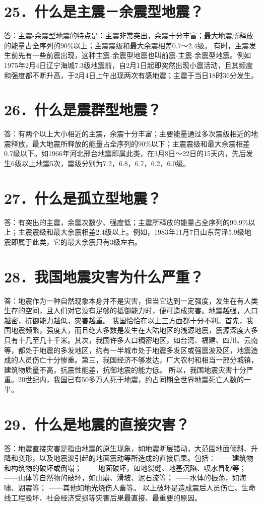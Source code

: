 \documentclass[a4paper,10pt,english]{sphinxmanual}
\begin{document}
\section{25．什么是主震－余震型地震？}
\label{\detokenize{index:id27}}
答：主震-余震型地震的特点是：主震非常突出，余震十分丰富；最大地震所释放的能量占全序列的90\%以上；主震震级和最大余震相差0.7～2.4级。
有时，主震发生前先有一些前震出现，这种主震-余震型地震也叫前震-主震-余震型地震。例如1975年2月4日辽宁海城7.3级地震前，自2月1日起即突然出现小震活动，且其频度和强度都不断升高，于2月4日上午出现两次有感地震；主震于当日18时36分发生。


\section{26．什么是震群型地震？}
\label{\detokenize{index:id28}}
答：有两个以上大小相近的主震，余震十分丰富；主要能量通过多次震级相近的地震释放，最大地震所释放的能量占全序列的90\%以下；主震震级和最大余震相差0.7级以下。如1966年河北邢台地震即属此类，在3月8日～22日的15天内，先后发生6级以上地震5次，震级分别为7.2，6.8，6.7，6.2，6.0级。


\section{27．什么是孤立型地震？}
\label{\detokenize{index:id29}}
答：有突出的主震，余震次数少、强度低；主震所释放的能量占全序列的99.9\%以上；主震震级和最大余震相差2.4级以上。例如，1983年11月7日山东菏泽5.9级地震即属于此类，它的最大余震只有3级左右。


\section{28．我国地震灾害为什么严重？}
\label{\detokenize{index:id30}}
答：地震作为一种自然现象本身并不是灾害，但当它达到一定强度，发生在有人类生存的空间，且人们对它没有足够的抵御能力时，便可造成灾害。地震越强，人口越密，抗御能力越低，灾害越重。
我国恰恰在以上三方面都十分不利。首先，我国地震频繁，强度大，而且绝大多数是发生在大陆地区的浅源地震，震源深度大多只有十几至几十千米。其次，我国许多人口稠密地区，如台湾、福建、四川、云南等，都处于地震的多发地区，约有一半城市处于地震多发区或强震波及区，地震造成的人员伤亡十分惨重。第三，我国经济不够发达，广大农村和相当一部分城镇，建筑物质量不高，抗震性能差，抗御地震的能力低。
所以，我国地震灾害十分严重。20世纪内，我国已有50多万人死于地震，约占同期全世界地震死亡人数的一半。


\section{29．什么是地震的直接灾害？}
\label{\detokenize{index:id31}}
答：地震直接灾害是指由地震的原生现象，如地震断层错动，大范围地面倾斜、升降和变形，以及地震波引起的地面震动等所造成的直接后果。包括：
——建筑物和构筑物的破坏或倒塌；
——地面破坏，如地裂缝、地基沉陷、喷水冒砂等；
——山体等自然物的破坏，如山崩、滑坡、泥石流等；
——水体的振荡，如海啸、湖震等；
——其他如地光烧伤人畜等。
以上破坏是造成震后人员伤亡、生命线工程毁坏、社会经济受损等灾害后果最直接、最重要的原因。
\end{document}
